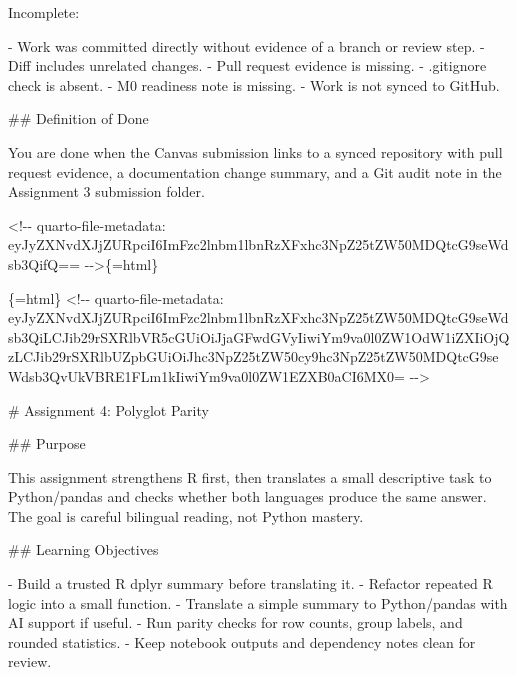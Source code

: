\documentclass[
  letterpaper,
  DIV=11,
  numbers=noendperiod,
  oneside]{scrreprt}
\newenvironment{Shaded}{\begin{snugshade}}{\end{snugshade}}
\newcommand{\FunctionTok}[1]{\textcolor[rgb]{0.28,0.35,0.67}{#1}}
\newcommand{\InformationTok}[1]{\textcolor[rgb]{0.37,0.37,0.37}{#1}}
\newcommand{\NormalTok}[1]{\textcolor[rgb]{0.00,0.23,0.31}{#1}}
\newcommand{\SpecialStringTok}[1]{\textcolor[rgb]{0.13,0.47,0.30}{#1}}
\begin{document}
\begin{Shaded}
\begin{Highlighting}[numbers=left,,]
\NormalTok{Incomplete:}

\SpecialStringTok{{-} }\NormalTok{Work was committed directly without evidence of a branch or review step.}
\SpecialStringTok{{-} }\NormalTok{Diff includes unrelated changes.}
\SpecialStringTok{{-} }\NormalTok{Pull request evidence is missing.}
\SpecialStringTok{{-} }\InformationTok{\textasciigrave{}.gitignore\textasciigrave{}}\NormalTok{ check is absent.}
\SpecialStringTok{{-} }\NormalTok{M0 readiness note is missing.}
\SpecialStringTok{{-} }\NormalTok{Work is not synced to GitHub.}

\FunctionTok{\#\# Definition of Done}

\NormalTok{You are done when the Canvas submission links to a synced repository with pull request evidence, a documentation change summary, and a Git audit note in the Assignment 3 submission folder.}


\InformationTok{\textasciigrave{}\textless{}!{-}{-} quarto{-}file{-}metadata: eyJyZXNvdXJjZURpciI6ImFzc2lnbm1lbnRzXFxhc3NpZ25tZW50MDQtcG9seWdsb3QifQ== {-}{-}\textgreater{}\textasciigrave{}}\NormalTok{\{=html\}}

\InformationTok{\textasciigrave{}\textasciigrave{}\textasciigrave{}\{=html\}}
\InformationTok{\textless{}!{-}{-} quarto{-}file{-}metadata: eyJyZXNvdXJjZURpciI6ImFzc2lnbm1lbnRzXFxhc3NpZ25tZW50MDQtcG9seWdsb3QiLCJib29rSXRlbVR5cGUiOiJjaGFwdGVyIiwiYm9va0l0ZW1OdW1iZXIiOjQzLCJib29rSXRlbUZpbGUiOiJhc3NpZ25tZW50cy9hc3NpZ25tZW50MDQtcG9seWdsb3QvUkVBRE1FLm1kIiwiYm9va0l0ZW1EZXB0aCI6MX0= {-}{-}\textgreater{}}
\InformationTok{\textasciigrave{}\textasciigrave{}\textasciigrave{}}

\FunctionTok{\# Assignment 4: Polyglot Parity }


\FunctionTok{\#\# Purpose}

\NormalTok{This assignment strengthens R first, then translates a small descriptive task to Python/pandas and checks whether both languages produce the same answer. The goal is careful bilingual reading, not Python mastery.}

\FunctionTok{\#\# Learning Objectives}

\SpecialStringTok{{-} }\NormalTok{Build a trusted R }\InformationTok{\textasciigrave{}dplyr\textasciigrave{}}\NormalTok{ summary before translating it.}
\SpecialStringTok{{-} }\NormalTok{Refactor repeated R logic into a small function.}
\SpecialStringTok{{-} }\NormalTok{Translate a simple summary to Python/pandas with AI support if useful.}
\SpecialStringTok{{-} }\NormalTok{Run parity checks for row counts, group labels, and rounded statistics.}
\SpecialStringTok{{-} }\NormalTok{Keep notebook outputs and dependency notes clean for review.}


\end{Highlighting}
\end{Shaded}
\end{document}
